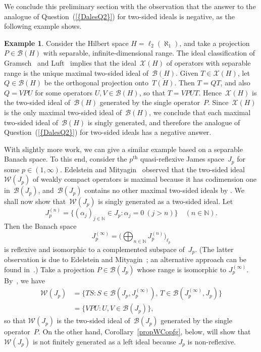 \documentclass[12pt]{amsart}
\theoremstyle{definition}
\newtheorem{example}[theorem]{Example}
\numberwithin{equation}{section}
\begin{document}
We conclude this preliminary section with the observation that the
answer to the analogue of Question~{{\normalfont\textrm{(\ref{{DalesQ2}})}}} for two-sided
ideals is negative, as the following example shows.

\begin{example} Consider the Hilbert space $H = \ell_2(\aleph_1)$, 
  and take a projection $P\in\mathscr{B}(H)$ with separable,
  infinite-dimensional range.  The ideal classification of
  Gramsch~\cite{gr} and Luft~\cite{luft} implies that the
  ideal~$\mathscr{X}(H)$ of operators with separable range is the
  unique maximal two-sided ideal of~$\mathscr{B}(H)$. Given
  $T\in\mathscr{X}(H)$, let $Q\in\mathscr{B}(H)$ be the orthogonal
  projection onto~$\overline{T(H)}$. Then $T = QT$, and also $Q = VPU$
  for some operators $U,V\in\mathscr{B}(H)$, so that $T =
  VPUT$. Hence~$\mathscr{X}(H)$ is the two-sided ideal
  of~$\mathscr{B}(H)$ generated by the single operator~$P$.
  Since~$\mathscr{X}(H)$ is the only maximal two-sided ideal
  of~$\mathscr{B}(H)$, we conclude that {each} maximal two-sided ideal
  of~$\mathscr{B}(H)$ is singly generated, and therefore the analogue
  of Question~{{\normalfont\textrm{(\ref{{DalesQ2}})}}} for two-sided ideals has a negative
  answer.

  With slightly more work, we can give a similar example based on a
  separable Banach space. To this end, consider the $p^{\text{th}}$
  quasi-reflexive James space~$J_p$ for some
  $p\in(1,\infty)$. Edelstein and Mityagin~\cite{em} observed that the
  two-sided ideal~$\mathscr{W}(J_p)$ of weakly compact opera\-tors is
  maximal because it has codimension one in~$\mathscr{B}(J_p)$,
  and~$\mathscr{B}(J_p)$ contains no other maximal two-sided ideals by
  \cite[Theorem~4.16]{lau1}.  We shall now show
  that~$\mathscr{W}(J_p)$ is singly generated as a two-sided
  ideal. Let \[ J_p^{(n)} = \bigl\{(\alpha_j)_{j\in{\ensuremath{\mathbb{N}}}}\in J_p :
  \alpha_j = 0\ (j>n)\bigr\}\quad (n\in{\ensuremath{\mathbb{N}}}).\] Then the Banach space
  \[ J_p^{(\infty)} = \biggl(\bigoplus_{n\in{\ensuremath{\mathbb{N}}}}
  J_p^{(n)}\biggr)_{\ell_p} \] is reflexive and isomorphic to a
  complemented subspace of~$J_p$. (The latter observation is due to
  Edelstein and Mityagin~\cite[Lemma~6(d)]{em}; an alter\-na\-tive
  approach can be found in~\cite[Proposition~4.4(iv)]{lau1}.)  Take a
  projec\-tion \mbox{$P\in\mathscr{B}(J_p)$} whose range is isomorphic
  to $J_p^{(\infty)}$. By~\cite[Theorem~4.3]{lau2}, we have
  \begin{align*} \mathscr{W}(J_p) &= \bigl\{ TS :
    S\in\mathscr{B}(J_p,J_p^{(\infty)}),\,
    T\in\mathscr{B}(J_p^{(\infty)}, J_p)\bigr\}\\ &= \bigl\{VPU :
    U,V\in\mathscr{B}(J_p)\bigr\},
  \end{align*}
  so that $\mathscr{W}(J_p)$ is the two-sided ideal
  of~$\mathscr{B}(J_p)$ generated by the single operator~$P$.
  On the other hand, Corollary~\ref{propWCopfg}, below, will show that
  $\mathscr{W}(J_p)$ is not finitely generated as a left ideal because
  $J_p$ is non-reflexive.
\end{example}
\end{document}
